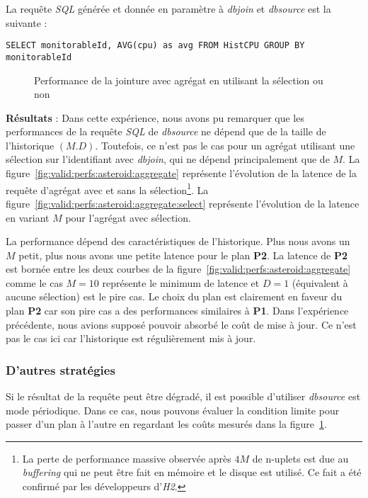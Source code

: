 La requête \textit{SQL} générée et donnée en paramètre à \textit{dbjoin} et \textit{dbsource} est la suivante : 
\begin{lstlisting}
SELECT monitorableId, AVG(cpu) as avg FROM HistCPU GROUP BY monitorableId
\end{lstlisting}

\begin{figure}[ht]
\caption{Performance de la jointure avec agrégat en utilisant la sélection ou non}\label{fig:valid:perfs:asteroid:agg}
\end{figure}

\textbf{Résultats} : Dans cette expérience, nous avons pu remarquer que les performances de la requête \textit{SQL} de \textit{dbsource} ne dépend que de la taille de l'historique $(M.D)$. Toutefois, ce n'est pas le cas pour un agrégat utilisant une sélection sur l'identifiant avec \textit{dbjoin}, qui ne dépend principalement que de $M$. La figure~\ref{fig:valid:perfs:asteroid:aggregate} représente l'évolution de la latence de la requête d'agrégat avec et sans la sélection\footnote{La perte de performance massive observée après $4M$ de n-uplets est due au \textit{buffering} qui ne peut être fait en mémoire et le disque est utilisé. Ce fait a été confirmé par les développeurs d'\textit{H2}.}. La figure~\ref{fig:valid:perfs:asteroid:aggregate:select} représente l'évolution de la latence en variant $M$ pour l'agrégat avec sélection.

La performance dépend des caractéristiques de l'historique. Plus nous avons un $M$ petit, plus nous avons une petite latence pour le plan \textbf{P2}. La latence de \textbf{P2} est bornée entre les deux courbes de la figure~\ref{fig:valid:perfs:asteroid:aggregate} comme le cas $M=10$ représente le minimum de latence et $D=1$ (équivalent à aucune sélection) est le pire cas. Le choix du plan est clairement en faveur du plan \textbf{P2} car son pire cas a des performances similaires à \textbf{P1}. Dans l'expérience précédente, nous avions supposé pouvoir absorbé le coût de mise à jour. Ce n'est pas le cas ici car l'historique est régulièrement mis à jour.

\subsubsection{D'autres stratégies}
Si le résultat de la requête peut être dégradé, il est possible d'utiliser \textit{dbsource} est mode périodique. Dans ce cas, nous pouvons évaluer la condition limite pour passer d'un plan à l'autre en regardant les coûts mesurés dans la figure~\ref{fig:valid:perfs:asteroid:agg}.

